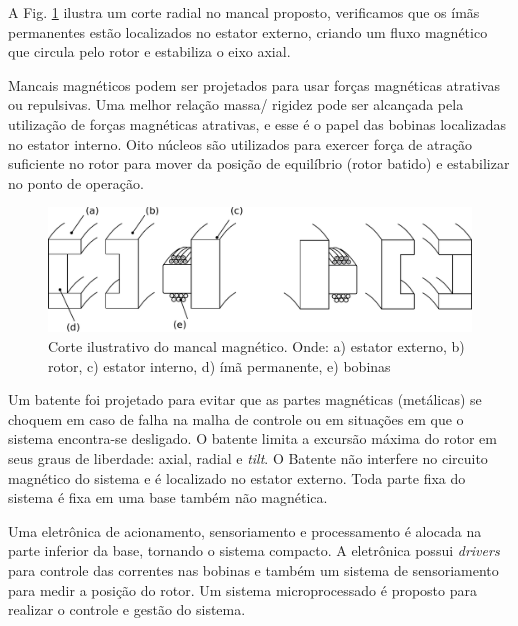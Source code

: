 A Fig. \ref{fig:mancal:corte} ilustra um corte radial no mancal proposto, verificamos que os ímãs permanentes estão localizados no estator externo, criando um fluxo magnético que circula pelo rotor e estabiliza o eixo axial.

Mancais magnéticos podem ser projetados para usar forças magnéticas atrativas ou repulsivas. Uma melhor relação massa/ rigidez pode ser alcançada pela utilização de forças magnéticas atrativas, e esse é o papel das bobinas localizadas no estator interno. Oito núcleos são utilizados para exercer força de atração suficiente no rotor para mover da posição de equilíbrio (rotor batido) e estabilizar no ponto de operação. 

\begin{figure}[ht!]
	\centering
	\includegraphics[width=1\linewidth]{./Figs/mancais/mancal_corte}
	\caption[Corte ilustrativo do mancal magnético]{Corte ilustrativo do mancal magnético. Onde: a) estator externo, b) rotor, c) estator interno, d) ímã permanente, e) bobinas}
	\label{fig:mancal:corte}
\end{figure}

Um batente foi projetado para evitar que as partes magnéticas (metálicas) se choquem em caso de falha na malha de controle ou em situações em que o sistema encontra-se desligado. O batente limita a excursão máxima do rotor em seus graus de liberdade: axial, radial e \textit{tilt}. O Batente não interfere no circuito magnético do sistema e é localizado no estator externo. Toda parte fixa do sistema é fixa em uma base também não magnética.

Uma eletrônica de acionamento, sensoriamento e processamento é alocada na parte inferior da base, tornando o sistema compacto. A eletrônica possui \textit{drivers} para controle das correntes nas bobinas e também um sistema de sensoriamento para medir a posição do rotor. Um sistema microprocessado é proposto para realizar o controle e gestão do sistema.

%

